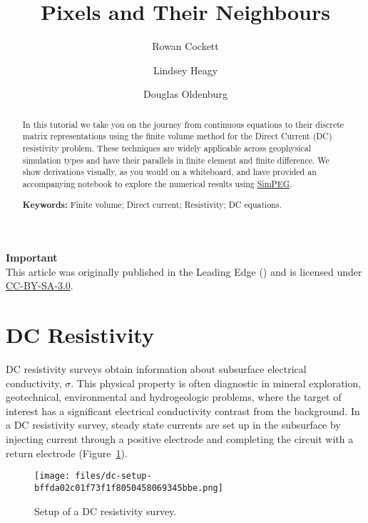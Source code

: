 \documentclass[Journal,InsideFigs,DoubleSpace,12pt,letterpaper]{ascelike-new}
\begin{document}
\title{Pixels and Their Neighbours}

\author[1]{Rowan Cockett}\author[1]{Lindsey Heagy}\author[1]{Douglas Oldenburg}

\maketitle

\begin{abstract}
In this tutorial we take you on the journey from continuous equations to their discrete matrix representations using the finite volume method for the Direct Current (DC) resistivity problem. These techniques are widely applicable across geophysical simulation types and have their parallels in finite element and finite difference. We show derivations visually, as you would on a whiteboard, and have provided an accompanying notebook to explore the numerical results using \href{http://simpeg.xyz/}{SimPEG}.

\noindent
\textbf{Keywords:} Finite volume; Direct current; Resistivity; DC equations.
\end{abstract}

\begin{framed}
\textbf{Important}\\
This article was originally published in the Leading Edge (\cite{Cockett_2016}) and is licensed under \href{https://creativecommons.org/licenses/by-sa/3.0/}{CC-BY-SA-3.0}.
\end{framed}

\section{DC Resistivity}\label{DC Resistivity}

DC resistivity surveys obtain information about subsurface electrical conductivity, $\sigma$. This physical property is often diagnostic in mineral exploration, geotechnical, environmental and hydrogeologic problems, where the target of interest has a significant electrical conductivity contrast from the background. In a DC resistivity survey, steady state currents are set up in the subsurface by injecting current through a positive electrode and completing the circuit with a return electrode (Figure~\ref{dc-setup}).

\begin{figure}[!htbp]
\centering
\texttt{[image: files/dc-setup-bffda02c01f73f1f8050458069345bbe.png]}
\caption{Setup of a DC resistivity survey.}
\label{dc-setup}
\end{figure}
\end{document}

